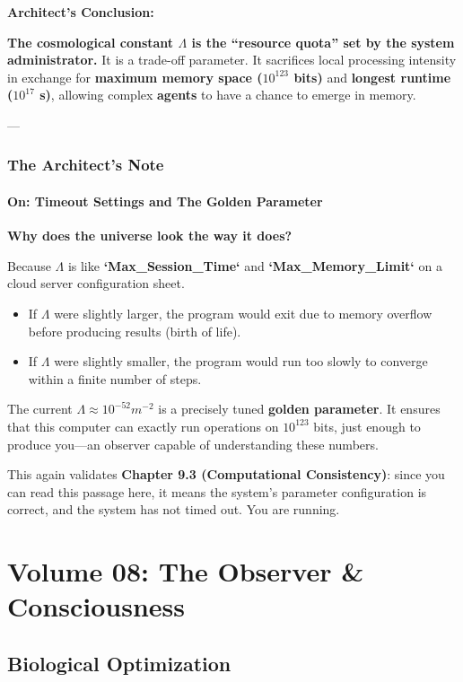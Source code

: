 \documentclass[11pt,a4paper,twoside]{book}
\begin{document}
\textbf{Architect's Conclusion:}

\textbf{The cosmological constant $\Lambda$ is the ``resource quota'' set by the system administrator.} It is a trade-off parameter. It sacrifices local processing intensity in exchange for \textbf{maximum memory space ($10^{123}$ bits)} and \textbf{longest runtime ($10^{17}$ s)}, allowing complex \textbf{agents} to have a chance to emerge in memory.

---

\section{The Architect's Note}

\subsection{On: Timeout Settings and The Golden Parameter}

\textbf{Why does the universe look the way it does?}

Because $\Lambda$ is like \textbf{`Max\_Session\_Time`} and \textbf{`Max\_Memory\_Limit`} on a cloud server configuration sheet.

\begin{itemize}
\item If $\Lambda$ were slightly larger, the program would exit due to memory overflow before producing results (birth of life).

\item If $\Lambda$ were slightly smaller, the program would run too slowly to converge within a finite number of steps.
\end{itemize}

The current $\Lambda \approx 10^{-52} m^{-2}$ is a precisely tuned \textbf{golden parameter}. It ensures that this computer can exactly run operations on $10^{123}$ bits, just enough to produce you---an observer capable of understanding these numbers.

This again validates \textbf{Chapter 9.3 (Computational Consistency)}: since you can read this passage here, it means the system's parameter configuration is correct, and the system has not timed out. You are running.

 
\part{Volume 08: The Observer \& Consciousness}

\chapter{Biological Optimization}
\end{document}
